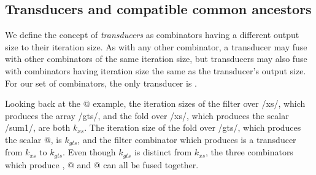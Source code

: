 


\subsection{Transducers and compatible common ancestors}
\label{clustering/size/transducers}

We define the concept of \emph{transducers} as combinators having a different output size to their iteration size.
As with any other combinator, a transducer may fuse with other combinators of the same iteration size, but transducers may also fuse with combinators having iteration size the same as the transducer's output size.
For our set of combinators, the only transducer is \Hs@filter@.

Looking back at the @ example, the iteration sizes of the filter over \Hs/xs/, which produces the array \Hs/gts/, and the fold over \Hs/xs/, which produces the scalar \Hs/sum1/, are both $k_{xs}$.
The iteration size of the fold over \Hs/gts/, which produces the scalar @, is $k_{gts}$, and the filter combinator which produces \Hs@gts@ is a transducer from $k_{xs}$ to $k_{gts}$. 
Even though $k_{gts}$ is distinct from $k_{xs}$, the three combinators which produce \Hs@gts@, @ and @ can all be fused together.

